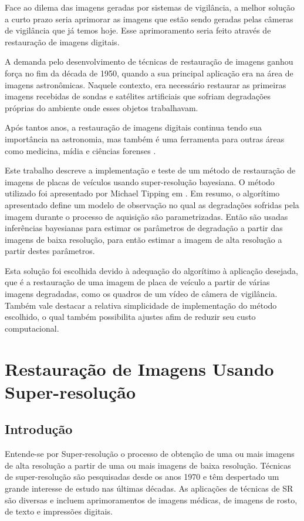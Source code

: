 \documentclass[12pt,openright,oneside,a4paper,english,brazil]{abntex2}
\begin{document}
Face ao dilema das imagens geradas por sistemas de vigilância,
a melhor solução a curto prazo seria aprimorar as imagens que estão sendo geradas pelas câmeras de vigilância que já temos hoje.
Esse aprimoramento seria feito através de restauração de imagens digitais.

A demanda pelo desenvolvimento de técnicas de restauração de imagens ganhou força no fim da década de 1950, quando a sua principal aplicação era na área de imagens astronômicas.
Naquele contexto, era necessário restaurar as primeiras imagens recebidas de sondas e satélites artificiais que sofriam degradações próprias do ambiente onde esses objetos trabalhavam.

Após tantos anos, a restauração de imagens digitais continua tendo sua importância na astronomia, mas também é uma ferramenta para outras áreas como medicina, mídia e ciências forenses \cite{banham1997digital}.

Este trabalho descreve a implementação e teste de um método de restauração de imagens de placas de veículos usando super-resolução bayesiana.
O método utilizado foi apresentado por Michael Tipping em \cite{tipping2003bayesian}.
Em resumo, o algorítimo apresentado define um modelo de observação no qual as degradações sofridas pela imagem durante o processo de aquisição são parametrizadas.
Então são usadas inferências bayesianas para estimar os parâmetros de degradação a partir das imagens de baixa resolução, para então estimar a imagem de alta resolução a partir destes parâmetros.

Esta solução foi escolhida devido à adequação do algorítimo à aplicação desejada, que é a restauração de uma imagem de placa de veículo a partir de várias imagens degradadas, como os quadros de um vídeo de câmera de vigilância.
Também vale destacar a relativa simplicidade de implementação do método escolhido, o qual também possibilita ajustes afim de reduzir seu custo computacional.


\chapter{Restauração de Imagens Usando Super-resolução}
\section{Introdução}
Entende-se por Super-resolução o processo de obtenção de uma ou mais imagens de alta resolução a partir de uma ou mais imagens de baixa resolução.
Técnicas de super-resolução são pesquisadas desde os anos 1970 e têm despertado um grande interesse de estudo nas últimas décadas.
As aplicações de técnicas de SR são diversas e incluem aprimoramentos de imagens médicas, de imagens de rosto, de texto e impressões digitais\cite{nasrollahi2014super}.
\end{document}
